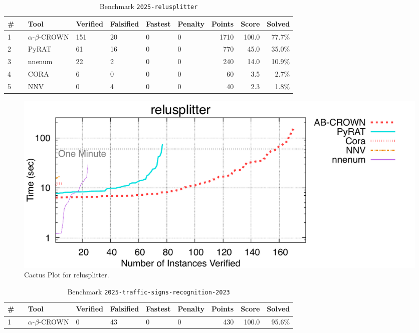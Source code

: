 \begin{table}[h]
\begin{center}
\caption{Benchmark \texttt{2025-relusplitter}} \label{tab:cat_2025_relusplitter}
{\setlength{\tabcolsep}{2pt}
\begin{tabular}[h]{@{}llllllrrr@{}}
\toprule
\textbf{\# ~} & \textbf{Tool} & \textbf{Verified} & \textbf{Falsified} & \textbf{Fastest} & \textbf{Penalty} & \textbf{Points} & \textbf{Score} & \textbf{Solved}\\
\midrule
1 & $\alpha$-$\beta$-CROWN & 151 & 20 & 0 & 0 & 1710 & 100.0 & 77.7\% \\
2 & PyRAT & 61 & 16 & 0 & 0 & 770 & 45.0 & 35.0\% \\
3 & nnenum & 22 & 2 & 0 & 0 & 240 & 14.0 & 10.9\% \\
4 & CORA & 6 & 0 & 0 & 0 & 60 & 3.5 & 2.7\% \\
5 & NNV & 0 & 4 & 0 & 0 & 40 & 2.3 & 1.8\% \\
\bottomrule
\end{tabular}
}
\end{center}
\end{table}



\begin{figure}[h]
\centerline{\includegraphics[width=\textwidth]{cactus/2025_relusplitter.pdf}}
\caption{Cactus Plot for relusplitter.}
\label{fig:quantPic}
\end{figure}


\clearpage

\begin{table}[h]
\begin{center}
\caption{Benchmark \texttt{2025-traffic-signs-recognition-2023}} \label{tab:cat_2025_traffic_signs_recognition_2023}
{\setlength{\tabcolsep}{2pt}
\begin{tabular}[h]{@{}llllllrrr@{}}
\toprule
\textbf{\# ~} & \textbf{Tool} & \textbf{Verified} & \textbf{Falsified} & \textbf{Fastest} & \textbf{Penalty} & \textbf{Points} & \textbf{Score} & \textbf{Solved}\\
\midrule
1 & $\alpha$-$\beta$-CROWN & 0 & 43 & 0 & 0 & 430 & 100.0 & 95.6\% \\
\bottomrule
\end{tabular}
}
\end{center}
\end{table}



